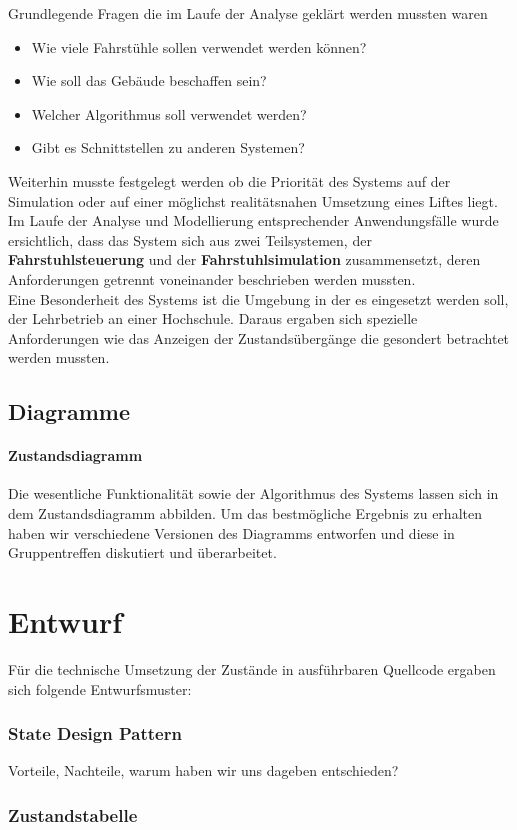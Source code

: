 Grundlegende Fragen die im Laufe der Analyse geklärt werden mussten waren
\begin{itemize}
	\item Wie viele Fahrstühle sollen verwendet werden können?
	\item Wie soll das Gebäude beschaffen sein?
	\item Welcher Algorithmus soll verwendet werden?
	\item Gibt es Schnittstellen zu anderen Systemen?
\end{itemize}
Weiterhin musste festgelegt werden ob die Priorität des Systems auf der 
Simulation oder auf einer möglichst realitätsnahen Umsetzung eines Liftes liegt.
Im Laufe der Analyse und Modellierung entsprechender Anwendungsfälle 
wurde ersichtlich, dass das System sich aus zwei Teilsystemen, der 
\textbf{Fahrstuhlsteuerung} und der \textbf{Fahrstuhlsimulation} zusammensetzt, 
deren Anforderungen getrennt voneinander beschrieben werden mussten.\\
Eine Besonderheit des Systems ist die Umgebung in der es eingesetzt werden 
soll, der Lehrbetrieb an einer Hochschule. Daraus ergaben sich spezielle 
Anforderungen wie das Anzeigen der Zustandsübergänge die gesondert betrachtet 
werden mussten.
\section{Diagramme}
\subsubsection{Zustandsdiagramm}
Die wesentliche Funktionalität sowie der Algorithmus des Systems lassen sich in 
dem Zustandsdiagramm abbilden. Um das bestmögliche Ergebnis zu erhalten haben 
wir verschiedene Versionen des Diagramms entworfen und diese in Gruppentreffen diskutiert und überarbeitet.
\chapter{Entwurf}
Für die technische Umsetzung der Zustände in ausführbaren Quellcode ergaben sich folgende Entwurfsmuster:
\subsection*{State Design Pattern}
Vorteile, Nachteile, warum haben wir uns dageben entschieden?
\subsection*{Zustandstabelle}
